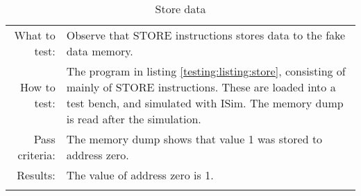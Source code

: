 \begin{table}[H]
  \begin{tabular}{r | p{8cm}}
    \noalign{\smallskip}\hline\noalign{\smallskip}
    
    What to test: & Observe that STORE instructions stores data to the fake data memory. \\

    \noalign{\smallskip}\hline\noalign{\smallskip}

    How to test:   & The program in listing \ref{testing:listing:store}, consisting of mainly of
                    STORE instructions. These are loaded into a test bench, and simulated with
                    ISim. The memory dump is read after the simulation. \\

    \noalign{\smallskip}\hline\noalign{\smallskip}

    Pass criteria: & The memory dump shows that value 1 was stored to address zero. \\

    \noalign{\smallskip}\hline\noalign{\smallskip}
    
    Results: &  The value of address zero is 1. \\
   \noalign{\smallskip}\hline\noalign{\smallskip}
  
  
  
  \end{tabular}
  \caption{Store data}
  \label{testing:fitness:store_data}
\end{table}
